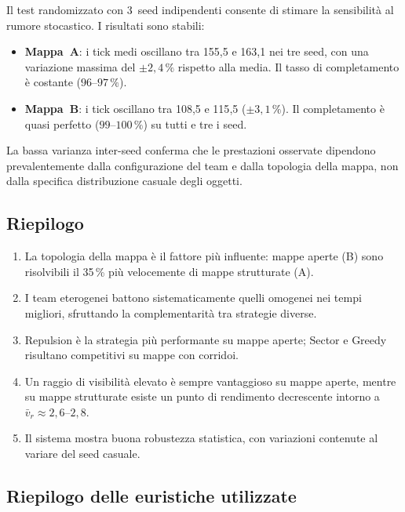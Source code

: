 Il test randomizzato con 3~seed indipendenti consente di stimare la sensibilit\`a al rumore
stocastico. I risultati sono stabili:

\begin{itemize}
  \item \textbf{Mappa~A}: i tick medi oscillano tra 155{,}5 e 163{,}1 nei tre seed,
        con una variazione massima del $\pm 2{,}4\,\%$ rispetto alla media.
        Il tasso di completamento \`e costante ($96$--$97\,\%$).
  \item \textbf{Mappa~B}: i tick oscillano tra 108{,}5 e 115{,}5 ($\pm 3{,}1\,\%$).
        Il completamento \`e quasi perfetto ($99$--$100\,\%$) su tutti e tre i seed.
\end{itemize}

La bassa varianza inter-seed conferma che le prestazioni osservate dipendono prevalentemente
dalla configurazione del team e dalla topologia della mappa, non dalla specifica
distribuzione casuale degli oggetti.

\subsection{Riepilogo}

\begin{enumerate}
  \item La topologia della mappa \`e il fattore pi\`u influente: mappe aperte (B) sono
        risolvibili il 35\,\% pi\`u velocemente di mappe strutturate (A).
  \item I team eterogenei battono sistematicamente quelli omogenei nei tempi migliori,
        sfruttando la complementarit\`a tra strategie diverse.
  \item Repulsion \`e la strategia pi\`u performante su mappe aperte;
        Sector e Greedy risultano competitivi su mappe con corridoi.
  \item Un raggio di visibilit\`a elevato \`e sempre vantaggioso su mappe aperte,
        mentre su mappe strutturate esiste un punto di rendimento decrescente
        intorno a $\bar{v}_r \approx 2{,}6$--$2{,}8$.
  \item Il sistema mostra buona robustezza statistica, con variazioni contenute
        al variare del seed casuale.
\end{enumerate}

\newpage
\subsection{Riepilogo delle euristiche utilizzate}

